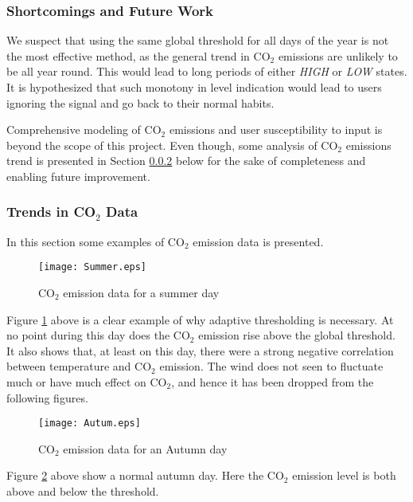 \documentclass[Main]{subfiles}
\begin{document}
	\subsubsection{Shortcomings and Future Work} %
	\label{sub:shortcomings_and_future_work}
		We suspect that using the same global threshold for all days of the year is not the most effective method, as the general trend in CO$_2$ emissions are unlikely to be all year round.
		This would lead to long periods of either \emph{HIGH} or \emph{LOW} states.
		It is hypothesized that such monotony in level indication would lead to users ignoring the signal and go back to their normal habits.

		Comprehensive modeling of CO$_2$ emissions and user susceptibility to input is beyond the scope of this project.
		Even though, some analysis of CO$_2$ emissions trend is presented in Section \ref{sub:trends_in_co2_data} below for the sake of completeness and enabling future improvement.



	\subsubsection{Trends in CO$_2$ Data} %
	\label{sub:trends_in_co2_data}
		
		In this section some examples of CO$_2$ emission data is presented.

		\begin{figure}[H]
			\centering 
			\texttt{[image: Summer.eps]}
			\caption{CO$_2$ emission data for a summer day}
			\label{fig:Summer}
		\end{figure}

		Figure \ref{fig:Summer} above is a clear example of why adaptive thresholding is necessary.
		At no point during this day does the CO$_2$ emission rise above the global threshold.
		It also shows that, at least on this day, there were a strong negative correlation between temperature and CO$_2$ emission.
		The wind does not seen to fluctuate much or have much effect on CO$_2$, and hence it has been dropped from the following figures.


		\begin{figure}[H]
			\centering
			\texttt{[image: Autum.eps]}
			\caption{CO$_2$ emission data for an Autumn day}
			\label{fig:Autum}
		\end{figure}

		Figure \ref{fig:Autum} above show a normal autumn day. Here the CO$_2$ emission level is both above and below the threshold.
\end{document}

